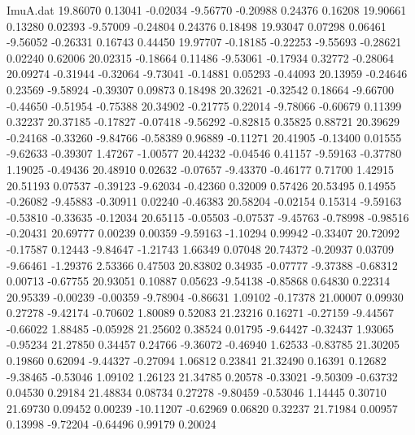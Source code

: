 \begin{filecontents}{ImuA.dat}
  19.86070    0.13041   -0.02034   -9.56770   -0.20988    0.24376    0.16208
  19.90661    0.13280    0.02393   -9.57009   -0.24804    0.24376    0.18498
  19.93047    0.07298    0.06461   -9.56052   -0.26331    0.16743    0.44450
  19.97707   -0.18185   -0.22253   -9.55693   -0.28621    0.02240    0.62006
  20.02315   -0.18664    0.11486   -9.53061   -0.17934    0.32772   -0.28064
  20.09274   -0.31944   -0.32064   -9.73041   -0.14881    0.05293   -0.44093
  20.13959   -0.24646    0.23569   -9.58924   -0.39307    0.09873    0.18498
  20.32621   -0.32542    0.18664   -9.66700   -0.44650   -0.51954   -0.75388
  20.34902   -0.21775    0.22014   -9.78066   -0.60679    0.11399    0.32237
  20.37185   -0.17827   -0.07418   -9.56292   -0.82815    0.35825    0.88721
  20.39629   -0.24168   -0.33260   -9.84766   -0.58389    0.96889   -0.11271
  20.41905   -0.13400    0.01555   -9.62633   -0.39307    1.47267   -1.00577
  20.44232   -0.04546    0.41157   -9.59163   -0.37780    1.19025   -0.49436
  20.48910    0.02632   -0.07657   -9.43370   -0.46177    0.71700    1.42915
  20.51193    0.07537   -0.39123   -9.62034   -0.42360    0.32009    0.57426
  20.53495    0.14955   -0.26082   -9.45883   -0.30911    0.02240   -0.46383
  20.58204   -0.02154    0.15314   -9.59163   -0.53810   -0.33635   -0.12034
  20.65115   -0.05503   -0.07537   -9.45763   -0.78998   -0.98516   -0.20431
  20.69777    0.00239    0.00359   -9.59163   -1.10294    0.99942   -0.33407
  20.72092   -0.17587    0.12443   -9.84647   -1.21743    1.66349    0.07048
  20.74372   -0.20937    0.03709   -9.66461   -1.29376    2.53366    0.47503
  20.83802    0.34935   -0.07777   -9.37388   -0.68312    0.00713   -0.67755
  20.93051    0.10887    0.05623   -9.54138   -0.85868    0.64830    0.22314
  20.95339   -0.00239   -0.00359   -9.78904   -0.86631    1.09102   -0.17378
  21.00007    0.09930    0.27278   -9.42174   -0.70602    1.80089    0.52083
  21.23216    0.16271   -0.27159   -9.44567   -0.66022    1.88485   -0.05928
  21.25602    0.38524    0.01795   -9.64427   -0.32437    1.93065   -0.95234
  21.27850    0.34457    0.24766   -9.36072   -0.46940    1.62533   -0.83785
  21.30205    0.19860    0.62094   -9.44327   -0.27094    1.06812    0.23841
  21.32490    0.16391    0.12682   -9.38465   -0.53046    1.09102    1.26123
  21.34785    0.20578   -0.33021   -9.50309   -0.63732    0.04530    0.29184
  21.48834    0.08734    0.27278   -9.80459   -0.53046    1.14445    0.30710
  21.69730    0.09452    0.00239  -10.11207   -0.62969    0.06820    0.32237
  21.71984    0.00957    0.13998   -9.72204   -0.64496    0.99179    0.20024

\end{filecontents}
